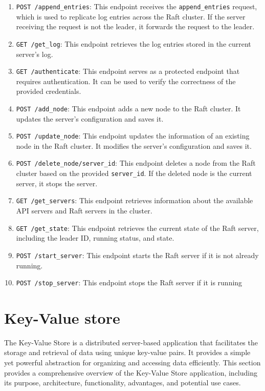 \documentclass{article}
\begin{document}
\begin{enumerate}
	\item \texttt{POST /append\_entries}: This endpoint receives the \texttt{append\_entries}
	request, which is used to replicate log entries across the Raft cluster. If the server receiving
	the request is not the leader, it forwards the request to the leader.
	\item \texttt{GET /get\_log}: This endpoint retrieves the log entries stored in the current server's log.
	\item \texttt{GET /authenticate}: This endpoint serves as a protected endpoint that requires
	authentication. It can be used to verify the correctness of the provided credentials.
	\item \texttt{POST /add\_node}: This endpoint adds a new node to the Raft cluster. It updates the
	server's configuration and saves it.
	\item \texttt{POST /update\_node}: This endpoint updates the information of an existing node in the
	Raft cluster. It modifies the server's configuration and saves it.
	\item \texttt{POST /delete\_node/{server\_id}}: This endpoint deletes a node from the Raft cluster
	based on the provided \texttt{server\_id}. If the deleted node is the current server, it stops the
	server.
	\item \texttt{GET /get\_servers}: This endpoint retrieves information about the available API servers
	and Raft servers in the cluster.
	\item \texttt{GET /get\_state}: This endpoint retrieves the current state of the Raft server, including
	the leader ID, running status, and state.
	\item \texttt{POST /start\_server}: This endpoint starts the Raft server if it is not already running.
	\item \texttt{POST /stop\_server}: This endpoint stops the Raft server if it is running
\end{enumerate}


\section{Key-Value store}
The Key-Value Store is a distributed server-based application that facilitates the storage
and retrieval of data using unique key-value pairs. It provides a simple yet powerful
abstraction for organizing and accessing data efficiently. This section provides a comprehensive
overview of the Key-Value Store application, including its purpose, architecture, functionality,
advantages, and potential use cases.
\end{document}
